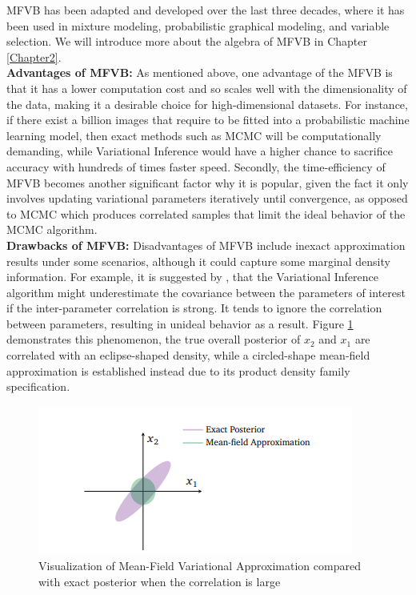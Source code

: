 MFVB has been adapted and developed over the last three decades, where it has been used in mixture modeling, probabilistic graphical modeling, and variable selection. We will introduce more about the algebra of MFVB in Chapter \ref{Chapter2}. \\
\textbf{Advantages of MFVB:}
As mentioned above, one advantage of the MFVB is that it has a lower computation cost and so scales well with the dimensionality of the data, making it a desirable choice for high-dimensional datasets. For instance, if there exist a billion images that require to be fitted into a probabilistic machine learning model, then exact methods such as MCMC will be computationally demanding, while Variational Inference would have a higher chance to sacrifice accuracy with hundreds of times faster speed.
Secondly, the time-efficiency of MFVB becomes another significant factor why it is popular, given the fact it only involves updating variational parameters iteratively until convergence, as opposed to MCMC which produces correlated samples that limit the ideal behavior of the MCMC algorithm.\\
\textbf{Drawbacks of MFVB:}
Disadvantages of MFVB include inexact approximation results under some scenarios, although it could capture some marginal density information. For example, it is suggested by \cite{blei_kucukelbir_mcauliffe_2017},
that the Variational Inference algorithm might underestimate the covariance between the parameters of interest if the inter-parameter correlation is strong. It tends to ignore the correlation between parameters, resulting in unideal behavior as a result. Figure \ref{fig:VIdemo}
demonstrates this phenomenon, the true overall posterior of $x_2$ and $x_1$ are correlated with an eclipse-shaped density, while a circled-shape mean-field approximation is established instead due to its product density family specification.
\begin{figure}
	\includegraphics[width=\linewidth]{VIdemo}
	\caption{Visualization of Mean-Field Variational Approximation compared with exact posterior when the correlation is large}
	\label{fig:VIdemo}
\end{figure}
